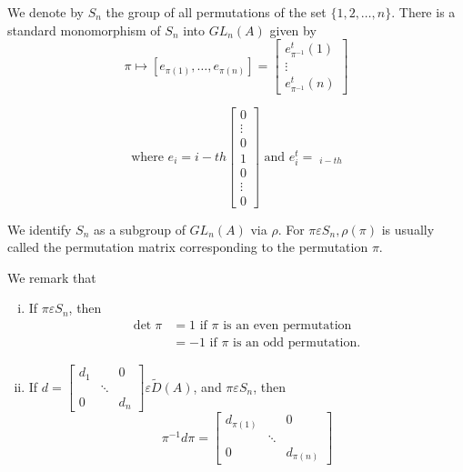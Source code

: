 We denote by $S_{n}$ the group of all permutations of the set
$\{1,2,\ldots,n\}$. There is a standard monomorphism of $S_n$ into
$GL_n(A)$ given by
$$
\pi\mapsto\left[e_{\pi(1)},\ldots,e_{\pi(n)}\right]=\begin{bmatrix}
e^{t}_{\pi^{-1}}(1)\\
\vdots\\
e^{t}_{\pi^{-1}}(n)
\end{bmatrix}
$$

$$
\text{ where } e_i= i-th
\begin{bmatrix}
0\\
\vdots\\
0\\
1\\
0\\
\vdots\\
0
\end{bmatrix} \text{ and } e^{t}_i=\displaystyle\mathop{[0,\ldots,0,1,0,\ldots,0]}_{i-th}
$$

We identify $S_n$ as a subgroup of $GL_n(A)$ via $\rho$. For $\pi
\varepsilon S_n,\rho(\pi)$ is usually called the permutation matrix
corresponding to the permutation $\pi$. 

We remark that 
\begin{enumerate}[(i)]
\item If $\pi \varepsilon S_n$, then 
\begin{align*}
\det \pi&=1\text{ if } \pi \text{ is an even permutation }\\
&=-1\text{ if } \pi\text{ is an odd permutation. }
\end{align*}

\item If $d=\begin{bmatrix}
d_1 & &0\\
& \ddots \\
0 & &d_n
\end{bmatrix} \varepsilon\tilde{D}(A)$, and $\pi \varepsilon S_n$, 
then
$$
\pi^{-1}d\pi=\begin{bmatrix}
d_{\pi(1)} & & 0\\
& \ddots\\
0 & & d_{\pi(n)}
\end{bmatrix}
$$
\end{enumerate}

